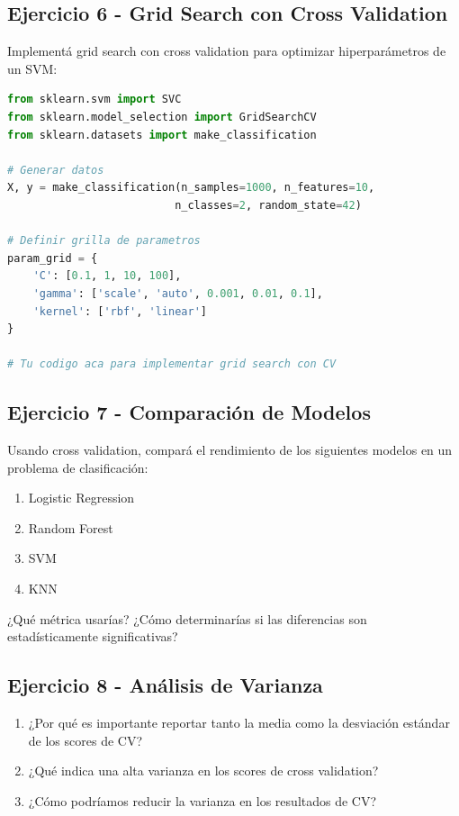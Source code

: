 \documentclass[12pt]{article}
\begin{document}
\subsection{Ejercicio 6 - Grid Search con Cross Validation}

Implementá grid search con cross validation para optimizar hiperparámetros de un SVM:

\begin{lstlisting}[language=Python]
from sklearn.svm import SVC
from sklearn.model_selection import GridSearchCV
from sklearn.datasets import make_classification

# Generar datos
X, y = make_classification(n_samples=1000, n_features=10, 
                          n_classes=2, random_state=42)

# Definir grilla de parametros
param_grid = {
    'C': [0.1, 1, 10, 100],
    'gamma': ['scale', 'auto', 0.001, 0.01, 0.1],
    'kernel': ['rbf', 'linear']
}

# Tu codigo aca para implementar grid search con CV
\end{lstlisting}

\subsection{Ejercicio 7 - Comparación de Modelos}

Usando cross validation, compará el rendimiento de los siguientes modelos en un problema de clasificación:

\begin{enumerate}
    \item Logistic Regression
    \item Random Forest
    \item SVM
    \item KNN
\end{enumerate}

¿Qué métrica usarías? ¿Cómo determinarías si las diferencias son estadísticamente significativas?

\subsection{Ejercicio 8 - Análisis de Varianza}

\begin{enumerate}
    \item ¿Por qué es importante reportar tanto la media como la desviación estándar de los scores de CV?
    \item ¿Qué indica una alta varianza en los scores de cross validation?
    \item ¿Cómo podríamos reducir la varianza en los resultados de CV?
\end{enumerate}
\end{document}
